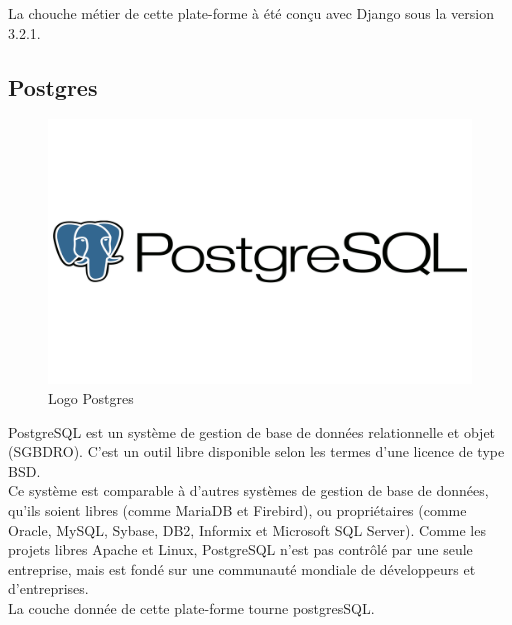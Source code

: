 \documentclass[a4paper, 12pt]{report}
\begin{document}
La chouche métier de cette plate-forme à été conçu avec Django sous la version 3.2.1.\cite{django}
\subsection{Postgres}
\begin{figure}[H]
    \centering
    \includegraphics[width = 0.5\linewidth]{img/PostgreSQL-Logo.png}
    \caption{Logo Postgres}
\end{figure}
PostgreSQL est un système de gestion de base de données relationnelle et objet (SGBDRO). C'est un outil libre disponible selon les termes d'une licence de type BSD.\\
Ce système est comparable à d'autres systèmes de gestion de base de données, qu'ils soient libres (comme MariaDB et Firebird), ou propriétaires (comme Oracle, MySQL, Sybase, DB2, Informix et Microsoft SQL Server). Comme les projets libres Apache et Linux, PostgreSQL n'est pas contrôlé par une seule entreprise, mais est fondé sur une communauté mondiale de développeurs et d'entreprises.\\
La couche donnée de cette plate-forme tourne postgresSQL.\cite{postgres}
\end{document}
